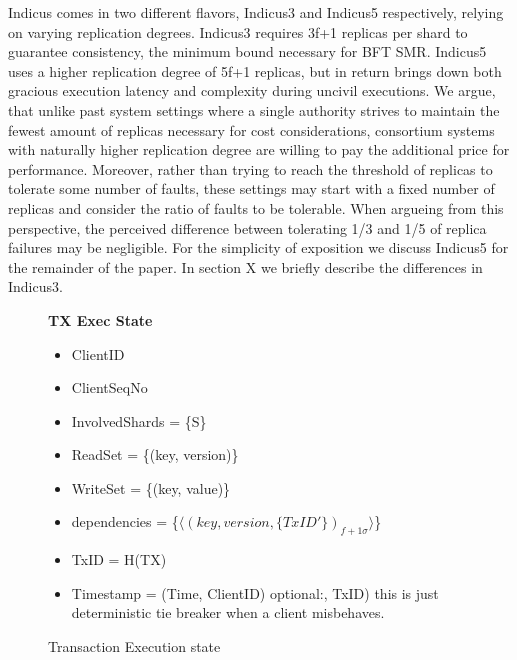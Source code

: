 
%
%
%
%
%
%
%
%

Indicus comes in two different flavors, Indicus3 and Indicus5 respectively, relying on varying replication degrees. Indicus3 requires 3f+1 replicas per shard to guarantee consistency, the minimum bound necessary for BFT SMR. Indicus5 uses a higher replication degree of 5f+1 replicas, but in return brings down both gracious execution latency and complexity during uncivil executions. We argue, that unlike past system settings where a single authority strives to maintain the fewest amount of replicas necessary for cost considerations, consortium systems with naturally higher replication degree are willing to pay the additional price for performance. Moreover, rather than trying to reach the threshold of replicas to tolerate some number of faults, these settings may start with a fixed number of replicas and consider the ratio of faults to be tolerable. When argueing from this perspective, the perceived difference between tolerating 1/3 and 1/5 of replica failures may be negligible.
For the simplicity of exposition we discuss Indicus5 for the remainder of the paper. In section X we briefly describe the differences in Indicus3.


\begin{figure}[t]
  \begin{mdframed}[roundcorner=10pt]
 	\textbf{TX Exec State}
 	\begin{itemize}
 	\item ClientID
 	\item ClientSeqNo
 	\item InvolvedShards = \{S\}
 	\item ReadSet = \{(key, version)\}
 	\item WriteSet = \{(key, value)\}
 	\item dependencies = \{$\langle (key, version, \{TxID'\})_{f+1 \sigma} \rangle$\}
 	\item TxID = H(TX)
 	\item Timestamp = (Time, ClientID)  optional:, TxID) this is just deterministic tie breaker when a client misbehaves.
 	\end{itemize}
  \end{mdframed}
  \caption{Transaction Execution state}
  \label{fig:TX}
\end{figure}

